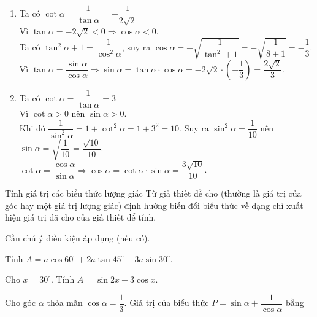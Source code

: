 \begin{vd}
{\begin{enumerate}
			\item Ta có $\cot \alpha = \dfrac{1}{\tan \alpha} = -\dfrac{1}{2\sqrt{2}}$\\
			      Vì $\tan\alpha=-2\sqrt{2}<0\Rightarrow\cos\alpha<0$.\\
			      Ta có $\tan^2\alpha+1=\dfrac{1}{\cos^2\alpha}$, suy ra $\cos\alpha=-\sqrt{\dfrac{1}{\tan^2+1}}=-\sqrt{\dfrac{1}{8+1}}=-\dfrac{1}{3}$.\\
			      Vì $\tan\alpha=\dfrac{\sin\alpha}{\cos\alpha}\Rightarrow\sin\alpha=\tan\alpha\cdot\cos\alpha=-2\sqrt{2}\cdot\left(-\dfrac{1}{3}\right)=\dfrac{2\sqrt{2}}{3}$.
			\item Ta có $\cot \alpha = \dfrac{1}{\tan \alpha} = 3$\\
			      Vì $\cot \alpha >0$ nên $\sin \alpha >0$.\\
			      Khi đó $\dfrac{1}{\sin ^2 \alpha}=1+\cot^2 \alpha = 1+3^2 =10$. Suy ra $\sin^2 \alpha = \dfrac{1}{10}$ nên $\sin \alpha = \sqrt{\dfrac{1}{10}}= \dfrac{\sqrt{10}}{10}$.\\
			      $\cot \alpha = \dfrac{\cos \alpha}{\sin \alpha} \Rightarrow \cos \alpha = \cot \alpha \cdot \sin \alpha = \dfrac{3\sqrt{10}}{10}$.
		\end{enumerate}
	}
\end{vd}
\begin{dang}{Tính giá trị các biểu thức lượng giác}
	Từ giả thiết đề cho (thường là giá trị của góc hay một giá trị lượng giác) định hướng biến đổi biểu thức về dạng chỉ xuất hiện giá trị đã cho của giả thiết để tính.
	\begin{note}
		Cần chú ý điều kiện áp dụng (nếu có).
	\end{note}
\end{dang}
\begin{vd}%
	Tính $A=a\cos60^{\circ}+2a\tan45^{\circ}-3a\sin30^{\circ}$.
\end{vd}
\begin{vd}%
	Cho $x=30^{\circ}$. Tính $A=\sin 2x-3\cos x$.
\end{vd}
\begin{vd}%
	Cho góc $\alpha$ thỏa mãn $\cos \alpha=\dfrac{1}{3}$. Giá trị của biểu thức $P=\sin \alpha+\dfrac{1}{\cos \alpha}$ bằng\\
\end{vd}
